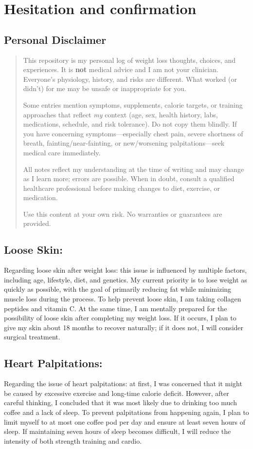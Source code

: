 \section{Hesitation and confirmation}
\label{sec:QA}
\subsection*{Personal Disclaimer}

\begin{quote}
This repository is my personal log of weight loss thoughts, choices, and experiences. It is \textbf{not} medical advice and I am not your clinician. Everyone’s physiology, history, and risks are different. What worked (or didn’t) for me may be unsafe or inappropriate for you.

Some entries mention symptoms, supplements, calorie targets, or training approaches that reflect \emph{my} context (age, sex, health history, labs, medications, schedule, and risk tolerance). Do not copy them blindly. If you have concerning symptoms—especially chest pain, severe shortness of breath, fainting/near-fainting, or new/worsening palpitations—seek medical care immediately.

All notes reflect my understanding at the time of writing and may change as I learn more; errors are possible. When in doubt, consult a qualified healthcare professional before making changes to diet, exercise, or medication.

Use this content at your own risk. No warranties or guarantees are provided.
\end{quote}

\subsection{Loose Skin:}
Regarding loose skin after weight loss: this issue is influenced by multiple factors, including age, lifestyle, diet, and genetics. My current priority is to lose weight as quickly as possible, with the goal of primarily reducing fat while minimizing muscle loss during the process. To help prevent loose skin, I am taking collagen peptides and vitamin C. At the same time, I am mentally prepared for the possibility of loose skin after completing my weight loss. If it occurs, I plan to give my skin about 18 months to recover naturally; if it does not, I will consider surgical treatment.

\subsection{Heart Palpitations:}
Regarding the issue of heart palpitations: at first, I was concerned that it might be caused by excessive exercise and long-time calorie deficit. However, after careful thinking, I concluded that it was most likely due to drinking too much coffee and a lack of sleep. To prevent palpitations from happening again, I plan to limit myself to at most one coffee pod per day and ensure at least seven hours of sleep. If maintaining seven hours of sleep becomes difficult, I will reduce the intensity of both strength training and cardio.


